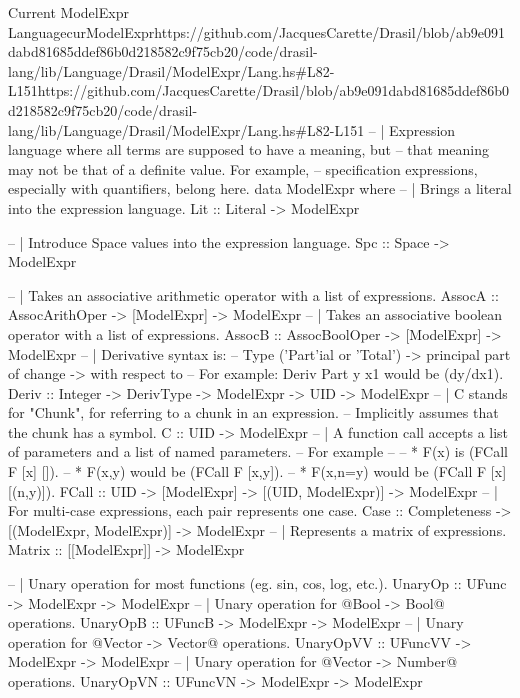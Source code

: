\begin{haskell}{Current ModelExpr Language}{curModelExpr}{https://github.com/JacquesCarette/Drasil/blob/ab9e091dabd81685ddef86b0d218582c9f75c\newline{}b20/code/drasil-lang/lib/Language/Drasil/ModelExpr/Lang.hs\#L82-L151}{https://github.com/JacquesCarette/Drasil/blob/ab9e091dabd81685ddef86b0d218582c9f75cb20/code/drasil-lang/lib/Language/Drasil/ModelExpr/Lang.hs\#L82-L151}
-- | Expression language where all terms are supposed to have a meaning, but
--   that meaning may not be that of a definite value. For example,
--   specification expressions, especially with quantifiers, belong here.
data ModelExpr where
  -- | Brings a literal into the expression language.
  Lit       :: Literal -> ModelExpr
  
  -- | Introduce Space values into the expression language.
  Spc       :: Space -> ModelExpr
  
  -- | Takes an associative arithmetic operator with a list of expressions.
  AssocA    :: AssocArithOper -> [ModelExpr] -> ModelExpr
  -- | Takes an associative boolean operator with a list of expressions.
  AssocB    :: AssocBoolOper  -> [ModelExpr] -> ModelExpr
  -- | Derivative syntax is:
  --   Type ('Part'ial or 'Total') -> principal part of change -> with respect to
  --   For example: Deriv Part y x1 would be (dy/dx1).
  Deriv     :: Integer -> DerivType -> ModelExpr -> UID -> ModelExpr
  -- | C stands for "Chunk", for referring to a chunk in an expression.
  --   Implicitly assumes that the chunk has a symbol.
  C         :: UID -> ModelExpr
  -- | A function call accepts a list of parameters and a list of named parameters.
  --   For example
  --
  --   * F(x) is (FCall F [x] []).
  --   * F(x,y) would be (FCall F [x,y]).
  --   * F(x,n=y) would be (FCall F [x] [(n,y)]).
  FCall     :: UID -> [ModelExpr] -> [(UID, ModelExpr)] -> ModelExpr
  -- | For multi-case expressions, each pair represents one case.
  Case      :: Completeness -> [(ModelExpr, ModelExpr)] -> ModelExpr
  -- | Represents a matrix of expressions.
  Matrix    :: [[ModelExpr]] -> ModelExpr
  
  -- | Unary operation for most functions (eg. sin, cos, log, etc.).
  UnaryOp       :: UFunc -> ModelExpr -> ModelExpr
  -- | Unary operation for @Bool -> Bool@ operations.
  UnaryOpB      :: UFuncB -> ModelExpr -> ModelExpr
  -- | Unary operation for @Vector -> Vector@ operations.
  UnaryOpVV     :: UFuncVV -> ModelExpr -> ModelExpr
  -- | Unary operation for @Vector -> Number@ operations.
  UnaryOpVN     :: UFuncVN -> ModelExpr -> ModelExpr
  

\end{haskell}
